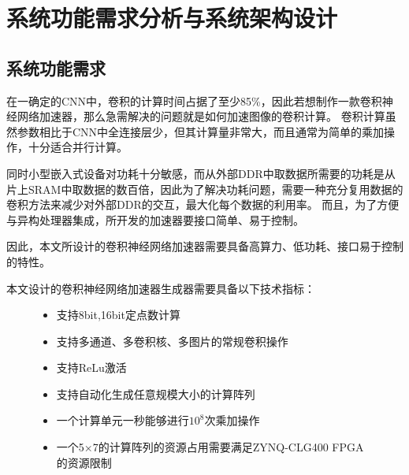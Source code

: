 \chapter{系统功能需求分析与系统架构设计}

\section{系统功能需求}
在一确定的CNN中，卷积的计算时间占据了至少85\%\cite{chen2017eyeriss}，因此若想制作一款卷积神经网络加速器，那么急需解决的问题就是如何加速图像的卷积计算。
卷积计算虽然参数相比于CNN中全连接层少，但其计算量非常大，而且通常为简单的乘加操作，十分适合并行计算。

同时小型嵌入式设备对功耗十分敏感，而从外部DDR中取数据所需要的功耗是从片上SRAM中取数据的数百倍\cite{chen2016eyeriss}，因此为了解决功耗问题，需要一种充分复用数据的卷积方法来减少对外部DDR的交互，最大化每个数据的利用率。
而且，为了方便与异构处理器集成，所开发的加速器要接口简单、易于控制。

因此，本文所设计的卷积神经网络加速器需要具备高算力、低功耗、接口易于控制的特性。

本文设计的卷积神经网络加速器生成器需要具备以下技术指标：
\begin{figure}[h]
    \begin{itemize}[topsep = 0 pt]
        \setlength{\topsep}{0pt}
        \setlength{\itemsep}{0pt}
        \setlength{\parsep}{0pt}
        \setlength{\parskip}{0pt}
        \setlength{\partopsep}{0pt}
        \item 支持8bit,16bit定点数计算
        \item 支持多通道、多卷积核、多图片的常规卷积操作
        \item 支持ReLu激活
        \item 支持自动化生成任意规模大小的计算阵列
        \item 一个计算单元一秒能够进行$10^8$次乘加操作
        \item 一个5×7的计算阵列的资源占用需要满足ZYNQ-CLG400 FPGA的资源限制
    \end{itemize}
\end{figure}

